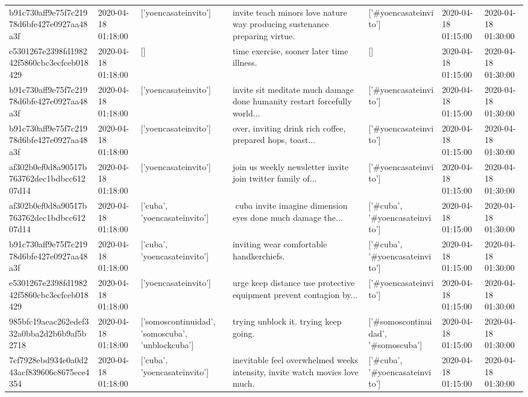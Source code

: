 \begin{tabular}{lllllll}
b91c730aff9e75f7c21978d6bfe427e0927aa48a3f & 2020-04-18 01:18:00 & ['yoencasateinvito'] & invite teach minors love nature way producing sustenance preparing virtue. & ['#yoencasateinvito'] & 2020-04-18 01:15:00 & 2020-04-18 01:30:00 \\
e5301267e2398fd198242f5860cbc3ecfceb018429 & 2020-04-18 01:18:00 & [] & time exercise, sooner later time illness. & [] & 2020-04-18 01:15:00 & 2020-04-18 01:30:00 \\
b91c730aff9e75f7c21978d6bfe427e0927aa48a3f & 2020-04-18 01:18:00 & ['yoencasateinvito'] & invite sit meditate much damage done humanity restart forcefully world... & ['#yoencasateinvito'] & 2020-04-18 01:15:00 & 2020-04-18 01:30:00 \\
b91c730aff9e75f7c21978d6bfe427e0927aa48a3f & 2020-04-18 01:18:00 & ['yoencasateinvito'] & over, inviting drink rich coffee, prepared hops, toast... & ['#yoencasateinvito'] & 2020-04-18 01:15:00 & 2020-04-18 01:30:00 \\
af302b0ef0d8a90517b763762dec1bdbcc61207d14 & 2020-04-18 01:18:00 & ['yoencasateinvito'] & join us weekly newsletter invite join twitter family of... & ['#yoencasateinvito'] & 2020-04-18 01:15:00 & 2020-04-18 01:30:00 \\
af302b0ef0d8a90517b763762dec1bdbcc61207d14 & 2020-04-18 01:18:00 & ['cuba', 'yoencasateinvito'] & ️ cuba invite imagine dimension eyes done much damage the... & ['#cuba', '#yoencasateinvito'] & 2020-04-18 01:15:00 & 2020-04-18 01:30:00 \\
b91c730aff9e75f7c21978d6bfe427e0927aa48a3f & 2020-04-18 01:18:00 & ['cuba', 'yoencasateinvito'] & inviting wear comfortable handkerchiefs. & ['#cuba', '#yoencasateinvito'] & 2020-04-18 01:15:00 & 2020-04-18 01:30:00 \\
e5301267e2398fd198242f5860cbc3ecfceb018429 & 2020-04-18 01:18:00 & ['yoencasateinvito'] & urge keep distance use protective equipment prevent contagion by... & ['#yoencasateinvito'] & 2020-04-18 01:15:00 & 2020-04-18 01:30:00 \\
985bfc19aeac262edef332a0bba2d2b6b9af5b2718 & 2020-04-18 01:18:00 & ['somoscontinuidad', 'somoscuba', 'unblockcuba'] & trying unblock it. trying keep going. & ['#somoscontinuidad', '#somoscuba'] & 2020-04-18 01:15:00 & 2020-04-18 01:30:00 \\
7cf7928ebd934e0a0d243acf839606c8675ece4354 & 2020-04-18 01:18:00 & ['cuba', 'yoencasateinvito'] & inevitable feel overwhelmed weeks intensity, invite watch movies love much. & ['#cuba', '#yoencasateinvito'] & 2020-04-18 01:15:00 & 2020-04-18 01:30:00 \\

\end{tabular}
